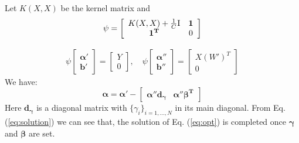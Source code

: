 Let $K(X,X)$ be the kernel matrix and
\begin{equation}\label{eq:linear}
\psi=\left[ {\begin{array}{*{20}{c}}
{K(X,X) + \frac{1}{C}{\rm{I}}}&\mathbf{1}\\
\mathbf{1^T}&0
\end{array}} \right]
\end{equation}

\begin{equation}
\begin{array}{c}
 {\psi}\left[ {\begin{array}{*{20}{c}}
{\boldsymbol{\alpha} '}\\
{\boldsymbol{b}'}
\end{array}} \right] = \left[ {\begin{array}{*{20}{c}}
Y\\
0
\end{array}} \right], \quad
{\psi}\left[ {\begin{array}{*{20}{c}}
{\boldsymbol{\alpha} ''}\\
{\boldsymbol{b}''}
\end{array}} \right] = \left[ {\begin{array}{*{20}{c}}
{X{{\left( {W'} \right)}^T}}\\
0
\end{array}} \right]
\end{array}
\end{equation}
We have:
\begin{equation}\label{eq:solution}
 \boldsymbol{\alpha}  = \boldsymbol{\alpha} ' - \left[ {\begin{array}{*{20}{c}}
 {\boldsymbol{\alpha} ''\boldsymbol{d_{\gamma}}}&{{\boldsymbol{\alpha} ''\boldsymbol{\beta ^T}}}
 \end{array}} \right]
\end{equation}
Here $\boldsymbol{d_{\gamma}}$ is a diagonal matrix with $\{\gamma_i\}_{i=1,...,N}$ in its main diagonal. From Eq. (\ref{eq:solution}) we can see that, the solution of Eq. (\ref{eq:opt}) is completed once $\boldsymbol{\gamma}$ and $\boldsymbol{\beta}$ are set.


